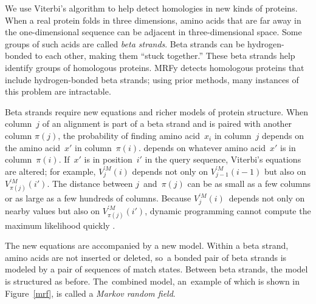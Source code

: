 \documentclass[preprint,nonatbib,blockstyle,times]{sigplanconf}
\newcommand\pairedwith[1]{{\pi(#1)}}
\newcommand\figref[1]{Figure~\ref{#1}}
\newcommand\seclabel[1]{\label{sec:#1}}
\let\cite\citep
\begin{document}
\seclabel{hofs}
\seclabel{mrfy}

We use Viterbi's algorithm to help detect
homologies in new kinds of proteins.
When a real protein folds in three dimensions, 
amino acids 
that are far away in the one-dimensional sequence can be
adjacent in three-dimensional space.
Some groups of such acids are called \emph{beta strands}.
Beta strands
can be hydrogen-bonded to each other,
making them ``stuck together.''
These beta strands help identify groups of homologous
proteins.
MRFy detects homologous proteins that include hydrogen-bonded beta
strands; using prior methods, many instances of this problem are
intractable. 

Beta strands require new equations and
richer models of protein structure.
When column~$j$ of an alignment is part of a beta strand and is paired
with another column  $\pairedwith j$,
the probability of finding amino acid~$x_i$ in column~$j$ 
\ifpagetuning
depends on the amino acid~$x'$ in column~${\pairedwith i}$.
\else
depends on whatever amino acid~$x'$  is in column~${\pairedwith i}$.
\fi
If~$x'$ is in position~$i'$ in the query sequence, Viterbi's
equations are altered; for example,
$V_{j}^{\prime M}(i)$ depends not only on
$V_{j-1}^{\prime M}(i-1)$ but also on
$V_{\pairedwith j}^{\prime M}(i')$.
The distance between $j$~and~$\pairedwith j$ can be as small as a few
columns or as large as a few hundreds of columns.
Because $V_j^{\prime M}(i)$~depends not only on nearby values but also on
$V_{\pairedwith j}^{\prime M}(i')$,
dynamic programming cannot compute the maximum likelihood quickly 
\cite{Menke:2010ti,Daniels:2012}.

The new equations are accompanied by a new model.
Within a beta strand, amino acids are not inserted or deleted, so~a
bonded pair of beta strands is modeled by 
 a pair of sequences of match states.
Between beta strands, the model is structured as before.
The~combined model, an~example of which is shown in \figref{mrf}, is called a
\textit{Markov random field}. 
\end{document}

